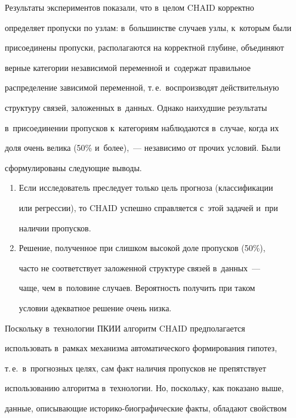   


  Результаты экспериментов показали, что в~целом CHAID корректно 


определяет пропуски по узлам: в~большинстве случаев узлы, к~которым были 


присоединены пропуски, располагаются на корректной глубине, объединяют 


верные категории независимой переменной и~содержат правильное 


распределение зависимой переменной, т.\,е.\ воспроизводят действительную 


структуру связей, заложенных в~данных. Однако наихудшие результаты 


в~присоединении пропусков к~категориям наблюдаются в~случае, когда их 


доля очень велика (50\% и~более),~--- независимо от прочих условий. Были 


сформулированы следующие выводы.


  \begin{enumerate}[1.]


\item Если исследователь преследует только цель прогноза (классификации 


или регрессии), то CHAID успешно справляется с~этой задачей и~при 


наличии пропусков.


\item Решение, полученное при слишком высокой доле пропусков (50\%), 


часто не соответствует заложенной структуре связей в~данных~--- 


чаще, чем в~половине случаев. Вероятность получить при таком 


условии адекватное решение очень низка.


\end{enumerate}


  


  Поскольку в~технологии ПКИИ алгоритм CHAID предполагается 


использовать в~рамках механизма автоматического формирования гипотез, 


т.\,е.\ в~прогнозных целях, сам факт наличия пропусков не препятствует 


использованию алгоритма в~технологии. Но, поскольку, как показано выше, 


данные, описывающие историко-биографические факты, обладают свойством 


